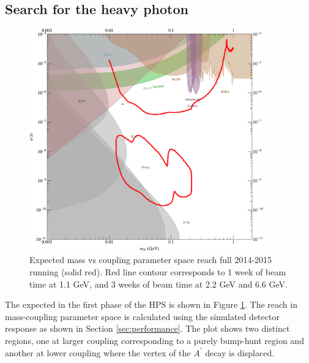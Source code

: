 \subsection{Search for the heavy photon}
\def \ap {A^\prime}
\def \map {m_{A^\prime}}
\def \thap {\theta_{A^\prime}}
\label{sec:apsignal}

\begin{figure}
\includegraphics[width=0.9\textwidth]{measurements/HPS-Proposal2014-SimpleReach.pdf}
\caption{Expected mass vs coupling parameter space reach  full 2014-2015 running (solid red). Red line contour corresponds to 1 week of beam time at 1.1 GeV, and 3 weeks of beam time at 2.2 GeV and 6.6 GeV.}
\label{fig:reach}
\end{figure}

The expected in the first phase of the HPS is shown in Figure \ref{fig:reach}. The reach in mass-coupling parameter space is calculated using the simulated detector response as shown in Section \ref{sec:performance}.  The plot shows two distinct regions,  one at larger coupling corresponding to a purely bump-hunt region and another at lower coupling where the vertex of the $\ap$ decay is displaced.  



